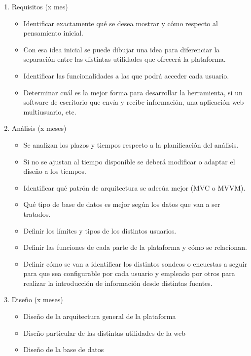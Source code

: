\begin{enumerate}
  
\item Requisitos (x mes)
  \begin{itemize}
  \item Identificar exactamente qué se desea mostrar y cómo respecto al pensamiento inicial.
  \item Con esa idea inicial se puede dibujar una idea para diferenciar la separación entre las distintas utilidades que ofrecerá la plataforma.
  \item Identificar las funcionalidades a las que podrá acceder cada usuario.
  \item Determinar cuál es la mejor forma para desarrollar la herramienta, si un software de escritorio que envía y recibe información, una aplicación web multiusuario, etc.
  \end{itemize}

\item Análisis (x meses)
  \begin{itemize}
  \item Se analizan los plazos y tiempos respecto a la planificación del análisis.
  \item Si no se ajustan al tiempo disponible se deberá modificar o adaptar el diseño a los tiempos.
  \item Identificar qué patrón de arquitectura se adec\'ua mejor (MVC o MVVM).
  \item Qué tipo de base de datos es mejor según los datos que van a ser tratados.
  \item Definir los límites y tipos de los distintos usuarios.
  \item Definir las funciones de cada parte de la plataforma y cómo se relacionan.
  \item Definir cómo se van a identificar los distintos sondeos o encuestas a seguir para que sea configurable por cada usuario y empleado por otros para realizar la introducción de información desde distintas fuentes.
  \end{itemize}


\item Diseño (x meses)
  \begin{itemize}
  \item Diseño de la arquitectura general de la plataforma
  \item Diseño particular de las distintas utilidades de la web
  \item Diseño de la base de datos
  \end{itemize}
  

\end{enumerate}
